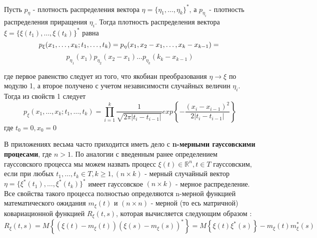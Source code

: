 \begin{enumerate}
    Пусть $p_\eta$ - плотность распределения вектора $\eta = \{\eta_1, \dots, \eta_k\}^{*}$, а $p_{\eta_i}$ - плотность распределения приращения $\eta_i$. Тогда плотность распределения вектора $\xi = \{\xi(t_1), \dots, \xi(t_k)\}^{*}$ равна
    \[p_\xi (x_1, \dots, x_k; t_1, \dots, t_k) = p_\eta (x_1, x_2 - x_1, \dots, x_k - x_{k-1}) = \newline\]
    \[p_{\eta_1} (x_1) p_{\eta_2}(x_2 - x_1)\dots p_{\eta_k}(k_k - x_{k-1})\]

    где первое равенство следует из того, что якобиан преобразования $\eta \to \xi$ по модулю 1, а второе получено с учетом независимости случайных величин $\eta_i$. Тогда из свойств 1 следует
    \[p_\xi (x_1, \dots, x_k; t_1, \dots, t_k) = \prod_{i=1}^{k} \frac{1}{\sqrt{2\pi |t_i - t_{i-1}|}} exp \left\{ -\frac{(x_i - x_{i-1})^2}{2|t_i - t_{i-1}|} \right\}\]
    где $t_0 = 0, x_0 = 0$


    В приложениях весьма часто приходится иметь дело с \textbf{n-мерными гауссовскими процесами}, где $n>1$. По аналогии с введенным ранее определением гауссовского процесса мы можем назвать процесс  $\xi(t) \in \mathbb{R}^{n} , t \in T$ гауссовским, если при любых $t_1, \dots, t_k \in T, k \geq 1,  (n \times k)$ - мерный случайный вектор $\eta = \{ \xi^* (t_1), \dots, \xi^* (t_k)\}^{*}$ имеет гауссовское $(n \times k)$ - мерное распределение. Все свойства такого процесса полностью определяются n-мерной функцией математического ожидания $m_\xi (t)$ и $(n \times n)$ - мерной (то есь матричной) ковариационной функцией $R_\xi (t, s)$, которая вычисляется следующим образом \cite{ShiryaevVeroyatnost1}:
    \[R_\xi (t, s) = M\left\{ (\xi(t) - m_\xi(t))(\xi(s) - m_\xi(s))^* \right\} = M\left\{\xi(t)\xi^* (s)\right\} - m_\xi (t)m^* _\xi (s)\]

\end{enumerate}

